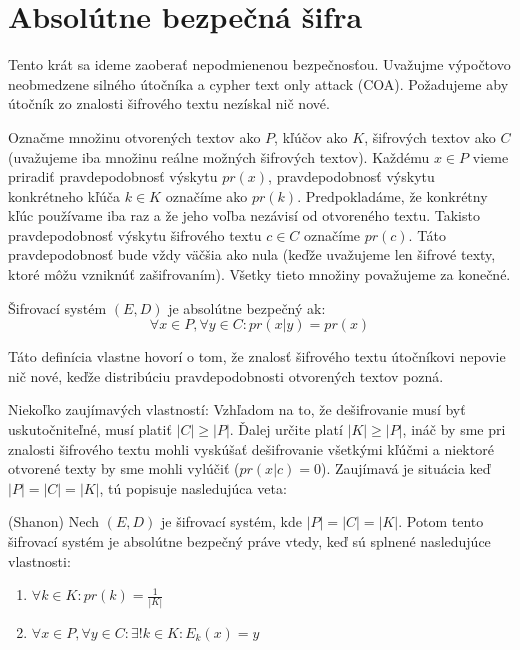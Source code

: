 \section{Absolútne bezpečná šifra}

Tento krát sa ideme zaoberať nepodmienenou bezpečnosťou. Uvažujme 
výpočtovo neobmedzene silného útočníka a cypher text only attack (COA).
Požadujeme aby útočník zo znalosti šifrového textu nezískal nič nové.

Označme množinu otvorených textov ako $P$, kľúčov ako $K$, šifrových textov ako $C$
(uvažujeme iba množinu reálne možných šifrových textov). Každému $x \in P$ vieme priradiť
pravdepodobnosť výskytu $pr(x)$, pravdepodobnosť
výskytu konkrétneho kľúča $k \in K$ označíme ako $pr(k)$. Predpokladáme, že
konkrétny kľúc používame iba raz a že jeho voľba nezávisí od otvoreného textu.
Takisto pravdepodobnosť výskytu šifrového textu $c \in C$ označíme $pr(c)$. Táto pravdepodobnosť
bude vždy väčšia ako nula (keďže uvažujeme len šifrové texty, ktoré môžu vzniknúť zašifrovaním).
Všetky tieto množiny považujeme za konečné.

\begin{definicia}
    Šifrovací systém $(E,D)$ je absolútne bezpečný ak:
    $$\forall x \in P, \forall y \in C\colon pr(x | y) = pr(x)$$
\end{definicia}
\begin{komentar}
    Táto definícia vlastne hovorí o tom, že znalosť šifrového textu útočníkovi nepovie nič
    nové, keďže distribúciu pravdepodobnosti otvorených textov pozná.
\end{komentar}

Niekoľko zaujímavých vlastností:
Vzhľadom na to, že dešifrovanie musí byť uskutočniteľné, musí platiť $|C| \geq |P|$.
Ďalej určite platí $|K| \geq |P|$, ináč by sme pri znalosti šifrového textu mohli 
vyskúšať dešifrovanie všetkými kľúčmi a niektoré otvorené texty by sme mohli vylúčiť
($pr(x|c) = 0$). Zaujímavá je situácia keď $|P| = |C| = |K|$, tú popisuje nasledujúca veta:

\begin{veta}{(Shanon)}
    Nech $(E,D)$ je šifrovací systém, kde $|P|=|C|=|K|$. Potom tento šifrovací systém je
    absolútne bezpečný práve vtedy, keď sú splnené nasledujúce vlastnosti:
    \begin{enumerate}
        \item $\forall k \in K\colon pr(k) = \frac{1}{|K|}$
        \item $\forall x \in P, \forall y \in C: \exists! k \in K\colon E_k(x) = y$
    \end{enumerate}
\end{veta}

